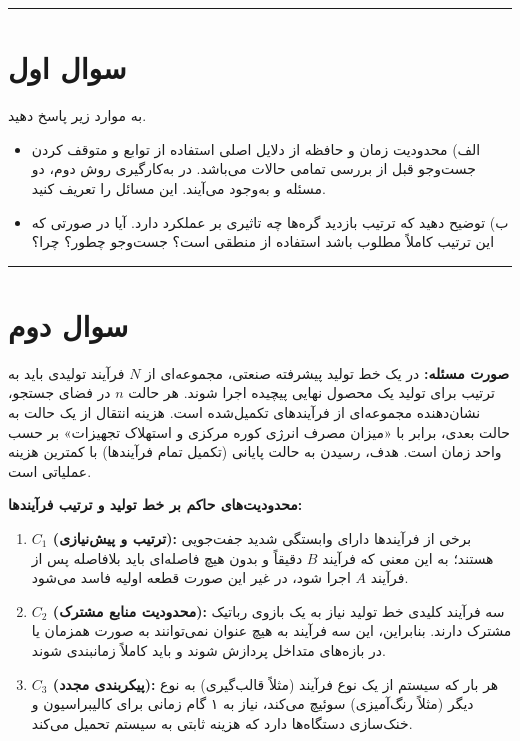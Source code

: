 \documentclass[a4paper,10pt]{article}
\begin{document}
\vspace{2pt}
\textcolor{AccentCyan}{\rule{\linewidth}{0.8pt}}
\section{\textcolor{AccentGold}{سوال اول}}
به موارد زیر پاسخ دهید.
\begin{itemize}
	\item الف)
محدودیت زمان و حافظه از دلایل اصلی استفاده از توابع  و متوقف کردن جست‌وجو قبل از بررسی تمامی حالات می‌باشد. در به‌کارگیری روش دوم، دو مسئله  و  به‌وجود می‌آیند. این مسائل را تعریف کنید.
\item ب)
توضیح دهید که ترتیب بازدید گره‌ها چه تاثیری بر عملکرد  دارد. آیا در صورتی که این ترتیب کاملاً مطلوب باشد استفاده از  منطقی است؟ جست‌وجو چطور؟ چرا؟
\end{itemize}
\textcolor{AccentCyan}{\rule{\linewidth}{0.4pt}}
\section{\textcolor{AccentGold}{سوال دوم}}
	\begin{infobox}
	\textbf{صورت مسئله:} 
	در یک خط تولید پیشرفته صنعتی، مجموعه‌ای از $N$ فرآیند تولیدی باید به ترتیب برای تولید یک محصول نهایی پیچیده اجرا شوند. هر حالت $n$ در فضای جستجو، نشان‌دهنده مجموعه‌ای از فرآیندهای تکمیل‌شده است. هزینه انتقال از یک حالت به حالت بعدی، برابر با «میزان مصرف انرژی کوره مرکزی و استهلاک تجهیزات» بر حسب واحد زمان است. هدف، رسیدن به حالت پایانی (تکمیل تمام فرآیندها) با کمترین هزینه عملیاتی است.
\end{infobox}

\pagebreak
\noindent \textbf{محدودیت‌های حاکم بر خط تولید و ترتیب فرآیندها:}
\begin{enumerate}
	\item \textbf{$C_1$ (ترتیب و پیش‌نیازی):} برخی از فرآیندها دارای وابستگی شدید جفت‌جویی هستند؛ به این معنی که فرآیند $B$ دقیقاً و بدون هیچ فاصله‌ای باید بلافاصله پس از فرآیند $A$ اجرا شود، در غیر این صورت قطعه اولیه فاسد می‌شود.
	\item \textbf{$C_2$ (محدودیت منابع مشترک):} سه فرآیند کلیدی خط تولید نیاز به یک بازوی رباتیک مشترک دارند. بنابراین، این سه فرآیند به هیچ عنوان نمی‌توانند به صورت همزمان یا در بازه‌های متداخل پردازش شوند و باید کاملاً  زمانبندی شوند.
	\item \textbf{$C_3$ (پیکربندی مجدد):} هر بار که سیستم از یک نوع فرآیند (مثلاً قالب‌گیری) به نوع دیگر (مثلاً رنگ‌آمیزی) سوئیچ می‌کند، نیاز به ۱ گام زمانی برای کالیبراسیون و خنک‌سازی دستگاه‌ها دارد که هزینه ثابتی به سیستم تحمیل می‌کند.
\end{enumerate}
\end{document}
